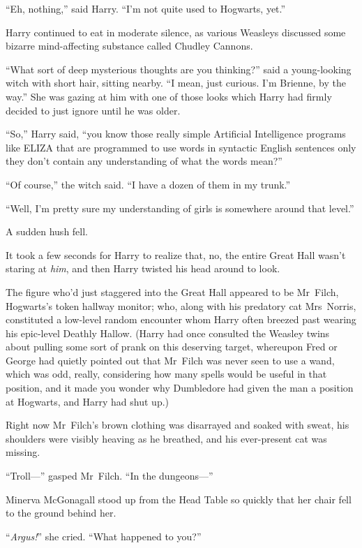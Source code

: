 “Eh, nothing,” said Harry. “I’m not quite used to Hogwarts, yet.”

Harry continued to eat in moderate silence, as various Weasleys discussed some bizarre mind-affecting substance called Chudley Cannons.

“What sort of deep mysterious thoughts are you thinking?” said a young-looking witch with short hair, sitting nearby. “I mean, just curious. I’m Brienne, by the way.” She was gazing at him with one of those looks which Harry had firmly decided to just ignore until he was older.

“So,” Harry said, “you know those really simple Artificial Intelligence programs like ELIZA that are programmed to use words in syntactic English sentences only they don’t contain any understanding of what the words mean?”

“Of course,” the witch said. “I have a dozen of them in my trunk.”

“Well, I’m pretty sure my understanding of girls is somewhere around that level.”

A sudden hush fell.

It took a few seconds for Harry to realize that, no, the entire Great Hall wasn’t staring at \emph{him}, and then Harry twisted his head around to look.

The figure who’d just staggered into the Great Hall appeared to be Mr~Filch, Hogwarts’s token hallway monitor; who, along with his predatory cat Mrs~Norris, constituted a low-level random encounter whom Harry often breezed past wearing his epic-level Deathly Hallow. (Harry had once consulted the Weasley twins about pulling some sort of prank on this deserving target, whereupon Fred or George had quietly pointed out that Mr~Filch was never seen to use a wand, which was odd, really, considering how many spells would be useful in that position, and it made you wonder why Dumbledore had given the man a position at Hogwarts, and Harry had shut up.)

Right now Mr~Filch’s brown clothing was disarrayed and soaked with sweat, his shoulders were visibly heaving as he breathed, and his ever-present cat was missing.

“Troll—” gasped Mr~Filch. “In the dungeons—”

\later

Minerva McGonagall stood up from the Head Table so quickly that her chair fell to the ground behind her.

“\emph{Argus!}” she cried. “What happened to you?”

